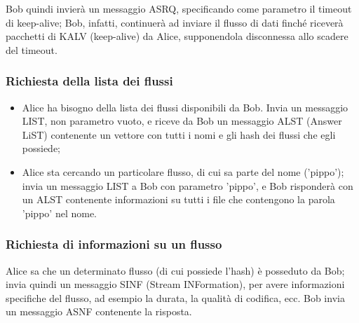 Bob quindi invierà un messaggio ASRQ, specificando come parametro il timeout di
keep-alive; Bob, infatti, continuerà ad inviare il flusso di dati finché riceverà
pacchetti di KALV (keep-alive) da Alice, supponendola disconnessa allo scadere
del timeout.






\subsubsection{Richiesta della lista dei flussi}
%

\begin{itemize}
\item Alice ha bisogno della lista dei flussi disponibili da Bob. Invia un messaggio LIST, non parametro vuoto, e riceve da Bob un messaggio ALST (Answer LiST) contenente un vettore con tutti i nomi e gli hash dei flussi che egli possiede;
\item Alice sta cercando un particolare flusso, di cui sa parte del nome
('pippo'); invia un messaggio LIST a Bob con parametro 'pippo', e Bob
risponderà con un ALST contenente informazioni su tutti i file che contengono la
parola 'pippo' nel nome.
\end{itemize}




\subsubsection{Richiesta di informazioni su un flusso}
%

Alice sa che un determinato flusso (di cui possiede l'hash) è posseduto da Bob;
invia quindi un messaggio SINF (Stream INFormation), per avere informazioni
specifiche del flusso, ad esempio la durata, la qualità di codifica, ecc. Bob
invia un messaggio ASNF contenente la risposta.






% 






